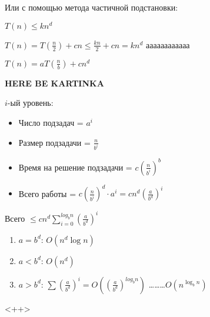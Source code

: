 \documentclass[11pt,a4paper]{article}
\begin{document}
Или с помощью метода частичной подстановки:

$T(n) \leqslant kn^d$

$T(n) = T\left( \frac n2 \right) + cn \leqslant \frac{kn}{2} + cn = kn^d$ аааааааааааа

\vspace{1cm}
$T(n) = aT\left( \frac nb \right) + cn^d$

\vspace{1.5cm}
\textbf{HERE BE KARTINKA}
\vspace{1.5cm}

$i$-ый уровень:
\begin{itemize}
    \item Число подзадач = $a^i$
    \item Размер подзадачи = $\frac{n}{b^i}$
    \item Время на решение подзадачи = $c\left( \frac{n}{b^i} \right)^b$
    \item Всего работы = $c\left(\frac{n}{b^i}\right)^d\cdot a^i = cn^d\left(\frac{a}{b^d}\right)^i$
\end{itemize}

Всего $\leqslant cn^d \sum\limits_{i=0}^{log_bn}\left( \frac{a}{b^d} \right)^i$
\begin{enumerate}
    \item $a = b^d$: $O(n^d\log n)$
    \item $a < b^d$: $O(n^d)$
    \item $a > b^d$: $\sum \left( \frac{a}{b^d} \right)^i = O\left( \left( \frac{a}{b^d} \right)^{log_bn} \right)$ \dots\dots\dots $O\left( n^{\log_bn} \right)$
\end{enumerate}<++>
\end{document}
